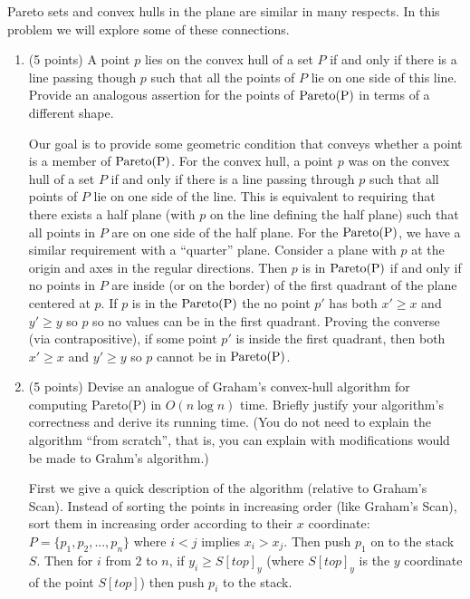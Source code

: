 \documentclass[11pt]{article}
\newcommand{\pareto}[1]{\rm{Pareto}(#1)}
\begin{document}
Pareto sets and convex hulls in the plane are similar in many respects.  In
this problem we will explore some of these connections.

\begin{enumerate}

\item (5 points) A point $p$ lies on the convex hull of a set $P$ if and only if there is
a line passing though $p$ such that all the points of $P$ lie on one side of
this line.  Provide an analogous assertion for the points of $\pareto{P}$ in
terms of a different shape.

\answer
Our goal is to provide some geometric condition that conveys whether a point is a member of $\pareto{P}$.
For the convex hull, a point $p$ was on the convex hull of a set $P$ if and only if there is a line passing through $p$ such that all points of $P$ lie on one side of the line.
This is equivalent to requiring that there exists a half plane (with $p$ on the line defining the half plane) such that all points in $P$ are on one side of the half plane.
For the $\pareto{P}$, we have a similar requirement with a ``quarter'' plane.
Consider a plane with $p$ at the origin and axes in the regular directions.
Then $p$ is in $\pareto{P}$ if and only if no points in $P$ are inside (or on the border) of the first quadrant of the plane centered at $p$.
If $p$ is in the $\pareto{P}$ the no point $p'$ has both $x' \geq x$ and $y' \geq y$ so $p$ so no values can be in the first quadrant.
Proving the converse (via contrapositive), if some point $p'$ is inside the first quadrant, then both $x' \geq x$ and $y' \geq y$ so $p$ cannot be in $\pareto{P}$.

\item (5 points) Devise an analogue of Graham's convex-hull algorithm for computing
\pareto{P} in $O(n \log n)$ time.  Briefly justify your algorithm's correctness
and derive its running time.  (You do not need to explain the algorithm ``from
scratch'', that is, you can explain with modifications would be made to Grahm's
algorithm.)

\answer
First we give a quick description of the algorithm (relative to Graham's Scan).
Instead of sorting the points in increasing order (like Graham's Scan), sort them in increasing order according to their $x$ coordinate: $P = \{ p_1, p_2, ..., p_n \}$ where $i < j$ implies $x_i > x_j$.
Then push $p_1$ on to the stack $S$.
Then for $i$ from $2$ to $n$, if $y_i \geq S[top]_y$ (where $S[top]_y$ is the $y$ coordinate of the point $S[top]$) then push $p_i$ to the stack.


\end{enumerate}
\end{document}
